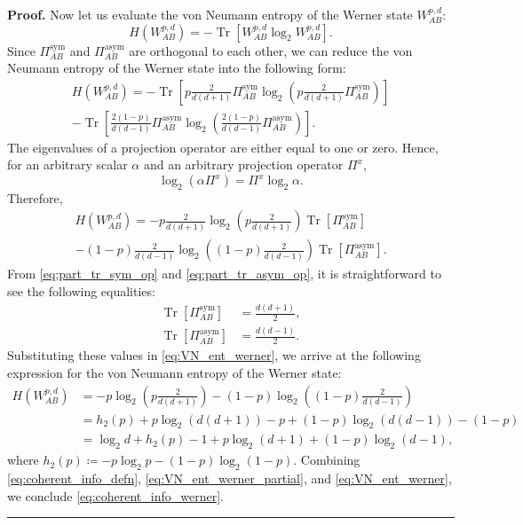 \documentclass[twocolumn,letterpaper, dvipsnames,allowtoday, accepted = 2025-12-31]{quantumarticle}
\newenvironment{proof}[1][Proof]{\noindent\textbf{#1.} }{\ \rule{0.5em}{0.5em}}
\begin{document}
\begin{proof}
	Now let us evaluate the von Neumann entropy of the Werner state $W^{p,d}_{AB}$:
	\begin{equation}
		H\!\left(W^{p,d}_{AB}\right) = -\operatorname{Tr}\!\left[W^{p,d}_{AB}\log_2 W^{p,d}_{AB}\right].
	\end{equation}
	Since $\Pi^{\operatorname{sym}}_{AB}$ and $\Pi^{\operatorname{asym}}_{AB}$ are orthogonal to each other, we can reduce the von Neumann entropy of the Werner state into the following form:
	\begin{multline}
		H\!\left(W^{p,d}_{AB}\right) = -\operatorname{Tr}\!\left[p\frac{2}{d(d+1)}\Pi^{\operatorname{sym}}_{AB}\log_2\!\left(p\frac{2}{d(d+1)} \Pi^{\operatorname{sym}}_{AB}\right)\right]
		\\
  -\operatorname{Tr}\!\left[\frac{2(1-p)}{d(d-1)}\Pi^{\operatorname{asym}}_{AB}\log_2\!\left(\frac{2(1-p)}{d(d-1)} \Pi^{\operatorname{asym}}_{AB}\right)\right].
	\end{multline}
	The eigenvalues of a projection operator are either equal to one or zero. Hence, for an arbitrary scalar $\alpha$ and an arbitrary projection operator $\Pi^x$,
	\begin{equation}\label{eq:proj_op_log_id}
		\log_2\!\left(\alpha \Pi^x\right) = \Pi^x\log_2\alpha.
	\end{equation}	 
	Therefore,
	\begin{multline}\label{eq:VN_ent_werner_simp}
		H\!\left(W^{p,d}_{AB}\right) = -p\frac{2}{d(d+1)}\log_2\!\left(p\frac{2}{d(d+1)}\right)\operatorname{Tr}\!\left[\Pi^{\operatorname{sym}}_{AB}\right] \\
  - (1-p)\frac{2}{d(d-1)}\log_2\!\left((1-p)\frac{2}{d(d-1)}\right)\operatorname{Tr}\!\left[\Pi^{\operatorname{asym}}_{AB}\right].
	\end{multline}
	From \eqref{eq:part_tr_sym_op} and \eqref{eq:part_tr_asym_op}, it is straightforward to see the following equalities:	
	\begin{align}
		\operatorname{Tr}\!\left[\Pi^{\operatorname{sym}}_{AB}\right] &= \frac{d(d+1)}{2},\\
		\operatorname{Tr}\!\left[\Pi^{\operatorname{asym}}_{AB}\right] &= \frac{d(d-1)}{2}.
	\end{align}
	Substituting these values in \eqref{eq:VN_ent_werner}, we arrive at the following expression for the von Neumann entropy of the Werner state:
	\begin{align}
		H\!\left(W^{p,d}_{AB}\right) &= -p\log_2\!\left(p\frac{2}{d(d+1)}\right) - (1-p)\log_2\!\left((1-p)\frac{2}{d(d-1)}\right)\\
        &= h_2(p) + p\log_2(d(d+1)) - p +(1-p)\log_2(d(d-1)) -(1-p)\\
        &= \log_2 d + h_2(p) - 1 +p\log_2 (d+1)+ (1-p)\log_2 (d-1),\label{eq:VN_ent_werner}
	\end{align}
    where $h_2(p)\coloneqq -p\log_2p - (1-p)\log_2(1-p)$.
	Combining \eqref{eq:coherent_info_defn}, \eqref{eq:VN_ent_werner_partial}, and \eqref{eq:VN_ent_werner}, we conclude \eqref{eq:coherent_info_werner}.
    \end{proof}
\end{document}
